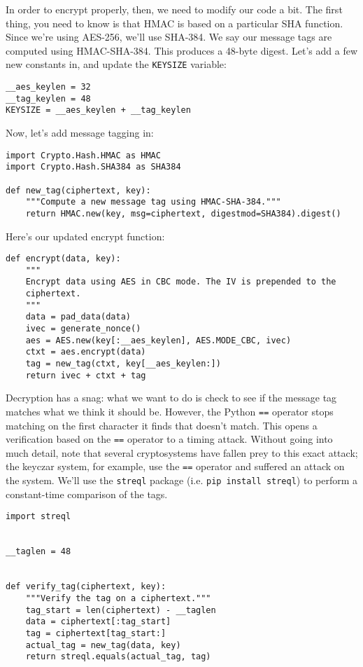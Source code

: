 \documentclass[letterpaper,10pt]{article}
\begin{document}
In order to encrypt properly, then, we need to modify our code a bit.
The first thing, you need to know is that HMAC is based on a
particular SHA function. Since we're using AES-256, we'll use SHA-384.
We say our message tags are computed using HMAC-SHA-384. This
produces a 48-byte digest. Let's add a few new constants in, and
update the \verb|KEYSIZE| variable:

\begin{verbatim}
__aes_keylen = 32
__tag_keylen = 48
KEYSIZE = __aes_keylen + __tag_keylen
\end{verbatim}

Now, let's add message tagging in:

\begin{verbatim}
import Crypto.Hash.HMAC as HMAC
import Crypto.Hash.SHA384 as SHA384

def new_tag(ciphertext, key):
    """Compute a new message tag using HMAC-SHA-384."""
    return HMAC.new(key, msg=ciphertext, digestmod=SHA384).digest()
\end{verbatim}

Here's our updated encrypt function:

\begin{verbatim}
def encrypt(data, key):
    """
    Encrypt data using AES in CBC mode. The IV is prepended to the
    ciphertext.
    """
    data = pad_data(data)
    ivec = generate_nonce()
    aes = AES.new(key[:__aes_keylen], AES.MODE_CBC, ivec)
    ctxt = aes.encrypt(data)
    tag = new_tag(ctxt, key[__aes_keylen:]) 
    return ivec + ctxt + tag
\end{verbatim}

Decryption has a snag: what we want to do is check to see if the
message tag matches what we think it should be. However, the Python
\verb|==| operator stops matching on the first character it finds that
doesn't match. This opens a verification based on the \verb|==| operator
to a timing attack. Without going into much detail, note that several
cryptosystems have fallen prey to this exact attack; the keyczar
system, for example, use the \verb|==| operator and suffered an attack
on the system. We'll use the \verb|streql| package (i.e.
\verb|pip install streql|) to perform a constant-time comparison
of the tags.

\begin{verbatim}
import streql


__taglen = 48


def verify_tag(ciphertext, key):
    """Verify the tag on a ciphertext."""
    tag_start = len(ciphertext) - __taglen
    data = ciphertext[:tag_start]
    tag = ciphertext[tag_start:]
    actual_tag = new_tag(data, key)
    return streql.equals(actual_tag, tag)
\end{verbatim}
\end{document}
